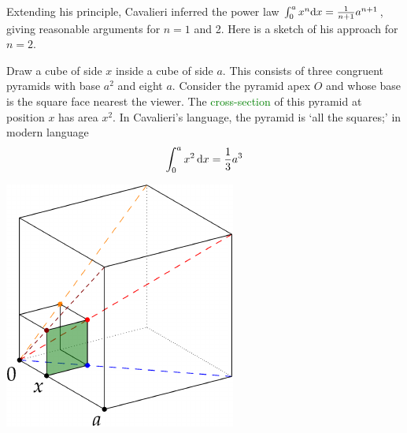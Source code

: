 Extending his principle, Cavalieri inferred the power law $\int_0^ax^n{\mathrm{d} x}=\frac 1{n+1}a^{n+1}$, giving reasonable arguments for $n=1$ and 2. Here is a sketch of his approach for $n=2$.\par
\begin{minipage}[t]{0.68\linewidth}\vspace{0pt}
Draw a cube of side $x$ inside a cube of side $a$. This consists of three congruent pyramids with base $a^2$ and eight $a$.\smallbreak
Consider the pyramid apex $O$ and whose base is the square face nearest the viewer. The \textcolor{Green}{cross-section} of this pyramid at position $x$ has area $x^2$. In Cavalieri's language, the pyramid is `all the squares;' in modern language
\[\int_0^ax^2\,{\mathrm{d} x}=\frac 13a^3\]
\end{minipage}\hfill\begin{minipage}[t]{0.3\linewidth}\vspace{-10pt}
\flushright
\href{http://www.math.uci.edu/~ndonalds/math184/analytic-cavalieri.html}{\includegraphics[scale=0.9]{analytic-cavalieri}}
\end{minipage}\medbreak

